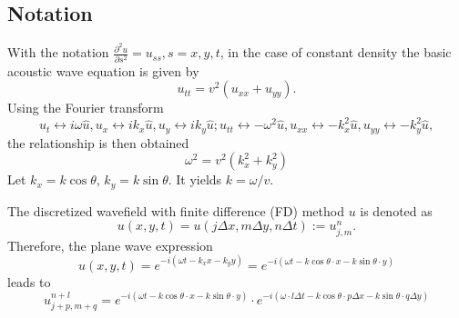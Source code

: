 \subsection{Notation}
With the notation $\frac{\partial^2 u}{\partial s^2}=u_{ss}, s=x,y,t$, in the case of constant density the basic acoustic wave equation is given by
\begin{equation}
 u_{tt}=v^2(u_{xx}+u_{yy}).
\end{equation}
Using the Fourier transform
\begin{equation}
u_t\leftrightarrow i\omega \hat{u}, u_x\leftrightarrow i k_x \hat{u}, u_y\leftrightarrow i k_y \hat{u};
u_{tt}\leftrightarrow -\omega^2 \hat{u},
u_{xx}\leftrightarrow -k_x^2 \hat{u},
u_{yy}\leftrightarrow-k_y^2 \hat{u},
\end{equation}
the relationship is then obtained
\begin{equation}
 \omega^2=v^2 (k_x^2+k_y^2)
\end{equation}
Let $k_x=k\cos\theta$, $k_y=k\sin\theta$. It yields  $k=\omega/v$.

The discretized wavefield with finite difference (FD) method $u$ is denoted as
\begin{equation}
 u(x,y,t)=u(j\Delta x, m\Delta y, n\Delta t):=u_{j,m}^n.
\end{equation}
Therefore, the plane wave expression
\begin{equation}
u(x,y,t)=e^{-i(\omega t- k_x x- k_y y)}=e^{-i(\omega t -k\cos\theta\cdot x-k\sin\theta\cdot y)}
\end{equation}
leads to
\begin{equation}
 u_{j+p,m+q}^{n+l}=e^{-i(\omega t -k\cos\theta\cdot x-k\sin\theta\cdot y)} \cdot
 e^{-i(\omega \cdot l\Delta t -k\cos\theta \cdot p\Delta x-k\sin\theta \cdot q\Delta y)}
\end{equation}

